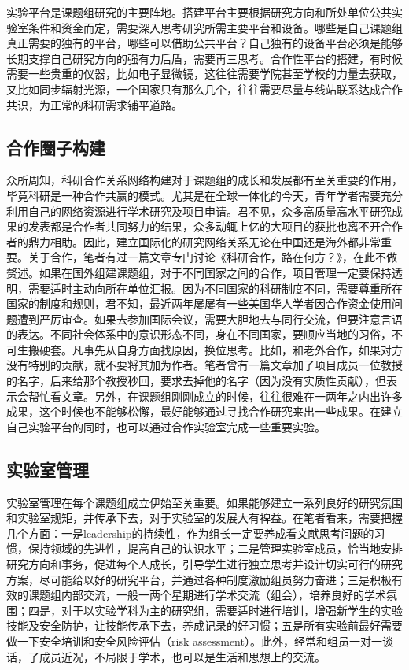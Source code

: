 \documentclass[
]{book}
\begin{document}
实验平台是课题组研究的主要阵地。搭建平台主要根据研究方向和所处单位公共实验室条件和资金而定，需要深入思考研究所需主要平台和设备。哪些是自己课题组真正需要的独有的平台，哪些可以借助公共平台？自己独有的设备平台必须是能够长期支撑自己研究方向的强有力后盾，需要再三思考。合作性平台的搭建，有时候需要一些贵重的仪器，比如电子显微镜，这往往需要学院甚至学校的力量去获取，又比如同步辐射光源，一个国家只有那么几个，往往需要尽量与线站联系达成合作共识，为正常的科研需求铺平道路。

\hypertarget{ux5408ux4f5cux5708ux5b50ux6784ux5efa}{%
\subsection{合作圈子构建}\label{ux5408ux4f5cux5708ux5b50ux6784ux5efa}}

众所周知，科研合作关系网络构建对于课题组的成长和发展都有至关重要的作用，毕竟科研是一种合作共赢的模式。尤其是在全球一体化的今天，青年学者需要充分利用自己的网络资源进行学术研究及项目申请。君不见，众多高质量高水平研究成果的发表都是合作者共同努力的结果，众多动辄上亿的大项目的获批也离不开合作者的鼎力相助。因此，建立国际化的研究网络关系无论在中国还是海外都非常重要。关于合作，笔者有过一篇文章专门讨论《科研合作，路在何方？》，在此不做赘述。如果在国外组建课题组，对于不同国家之间的合作，项目管理一定要保持透明，需要适时主动向所在单位汇报。因为不同国家的科研制度不同，需要尊重所在国家的制度和规则，君不知，最近两年屡屡有一些美国华人学者因合作资金使用问题遭到严厉审查。如果去参加国际会议，需要大胆地去与同行交流，但要注意言语的表达。不同社会体系中的意识形态不同，身在不同国家，要顺应当地的习俗，不可生搬硬套。凡事先从自身方面找原因，换位思考。比如，和老外合作，如果对方没有特别的贡献，就不要将其加为作者。笔者曾有一篇文章加了项目成员一位教授的名字，后来给那个教授秒回，要求去掉他的名字（因为没有实质性贡献），但表示会帮忙看文章。另外，在课题组刚刚成立的时候，往往很难在一两年之内出许多成果，这个时候也不能够松懈，最好能够通过寻找合作研究来出一些成果。在建立自己实验平台的同时，也可以通过合作实验室完成一些重要实验。

\hypertarget{ux5b9eux9a8cux5ba4ux7ba1ux7406}{%
\subsection{实验室管理}\label{ux5b9eux9a8cux5ba4ux7ba1ux7406}}

实验室管理在每个课题组成立伊始至关重要。如果能够建立一系列良好的研究氛围和实验室规矩，并传承下去，对于实验室的发展大有裨益。在笔者看来，需要把握几个方面：一是leadership的持续性，作为组长一定要养成看文献思考问题的习惯，保持领域的先进性，提高自己的认识水平；二是管理实验室成员，恰当地安排研究方向和事务，促进每个人成长，引导学生进行独立思考并设计切实可行的研究方案，尽可能给以好的研究平台，并通过各种制度激励组员努力奋进；三是积极有效的课题组内部交流，一般一两个星期进行学术交流（组会），培养良好的学术氛围；四是，对于以实验学科为主的研究组，需要适时进行培训，增强新学生的实验技能及安全防护，让技能传承下去，养成记录的好习惯；五是所有实验前最好需要做一下安全培训和安全风险评估（risk assessment）。此外，经常和组员一对一谈话，了成员近况，不局限于学术，也可以是生活和思想上的交流。
\end{document}
